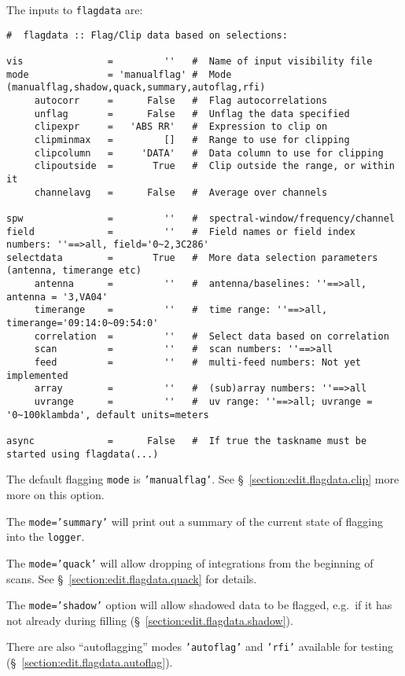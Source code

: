 The inputs to {\tt flagdata} are:
\small
\begin{verbatim}
#  flagdata :: Flag/Clip data based on selections:

vis               =         ''   #  Name of input visibility file
mode              = 'manualflag' #  Mode (manualflag,shadow,quack,summary,autoflag,rfi)
     autocorr     =      False   #  Flag autocorrelations
     unflag       =      False   #  Unflag the data specified
     clipexpr     =   'ABS RR'   #  Expression to clip on
     clipminmax   =         []   #  Range to use for clipping
     clipcolumn   =     'DATA'   #  Data column to use for clipping
     clipoutside  =       True   #  Clip outside the range, or within it
     channelavg   =      False   #  Average over channels

spw               =         ''   #  spectral-window/frequency/channel
field             =         ''   #  Field names or field index numbers: ''==>all, field='0~2,3C286'
selectdata        =       True   #  More data selection parameters (antenna, timerange etc)
     antenna      =         ''   #  antenna/baselines: ''==>all, antenna = '3,VA04'
     timerange    =         ''   #  time range: ''==>all, timerange='09:14:0~09:54:0'
     correlation  =         ''   #  Select data based on correlation
     scan         =         ''   #  scan numbers: ''==>all
     feed         =         ''   #  multi-feed numbers: Not yet implemented
     array        =         ''   #  (sub)array numbers: ''==>all
     uvrange      =         ''   #  uv range: ''==>all; uvrange = '0~100klambda', default units=meters

async             =      False   #  If true the taskname must be started using flagdata(...)
\end{verbatim}
\normalsize

The default flagging {\tt mode} is {\tt 'manualflag'}.  See 
\S~\ref{section:edit.flagdata.clip} more more on this option.

The {\tt mode='summary'} will print out a summary of the current
state of flagging into the {\tt logger}.

The {\tt mode='quack'} will allow dropping of integrations from the
beginning of scans.  See \S~\ref{section:edit.flagdata.quack} for
details.

The {\tt mode='shadow'} option will allow shadowed data to be flagged,
e.g.\ if it has not already during filling 
(\S~\ref{section:edit.flagdata.shadow}).

There are also ``autoflagging'' modes {\tt'autoflag'} and {\tt'rfi'} 
available for testing (\S~\ref{section:edit.flagdata.autoflag}).


